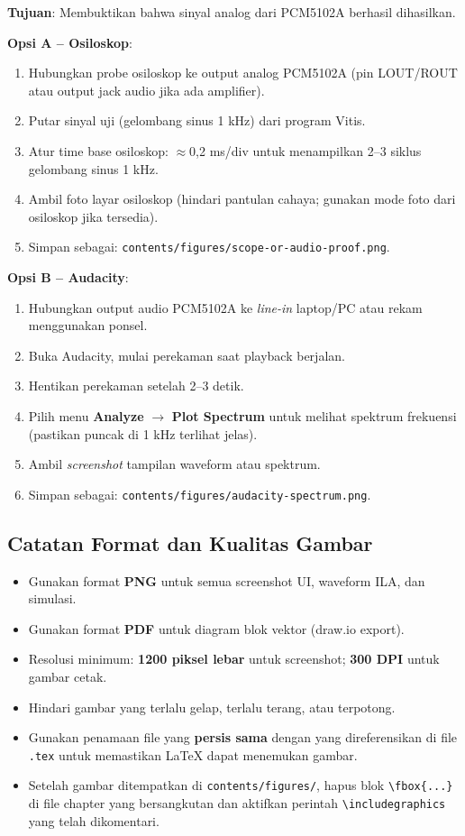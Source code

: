 \textbf{Tujuan}: Membuktikan bahwa sinyal analog dari PCM5102A berhasil dihasilkan.

\textbf{Opsi A -- Osiloskop}:
\begin{enumerate}
    \item Hubungkan probe osiloskop ke output analog PCM5102A (pin LOUT/ROUT atau output jack audio jika ada amplifier).
    \item Putar sinyal uji (gelombang sinus 1 kHz) dari program Vitis.
    \item Atur time base osiloskop: $\approx$0,2 ms/div untuk menampilkan 2--3 siklus gelombang sinus 1 kHz.
    \item Ambil foto layar osiloskop (hindari pantulan cahaya; gunakan mode foto dari osiloskop jika tersedia).
    \item Simpan sebagai: \texttt{contents/figures/scope-or-audio-proof.png}.
\end{enumerate}

\textbf{Opsi B -- Audacity}:
\begin{enumerate}
    \item Hubungkan output audio PCM5102A ke \textit{line-in} laptop/PC atau rekam menggunakan ponsel.
    \item Buka Audacity, mulai perekaman saat playback berjalan.
    \item Hentikan perekaman setelah 2--3 detik.
    \item Pilih menu \textbf{Analyze} $\rightarrow$ \textbf{Plot Spectrum} untuk melihat spektrum frekuensi (pastikan puncak di 1 kHz terlihat jelas).
    \item Ambil \textit{screenshot} tampilan waveform atau spektrum.
    \item Simpan sebagai: \texttt{contents/figures/audacity-spectrum.png}.
\end{enumerate}

\subsection{Catatan Format dan Kualitas Gambar}

\begin{itemize}
    \item Gunakan format \textbf{PNG} untuk semua screenshot UI, waveform ILA, dan simulasi.
    \item Gunakan format \textbf{PDF} untuk diagram blok vektor (draw.io export).
    \item Resolusi minimum: \textbf{1200 piksel lebar} untuk screenshot; \textbf{300 DPI} untuk gambar cetak.
    \item Hindari gambar yang terlalu gelap, terlalu terang, atau terpotong.
    \item Gunakan penamaan file yang \textbf{persis sama} dengan yang direferensikan di file \texttt{.tex} untuk memastikan LaTeX dapat menemukan gambar.
    \item Setelah gambar ditempatkan di \texttt{contents/figures/}, hapus blok \texttt{\textbackslash{}fbox\{...\}} di file chapter yang bersangkutan dan aktifkan perintah \texttt{\textbackslash{}includegraphics} yang telah dikomentari.
\end{itemize}


